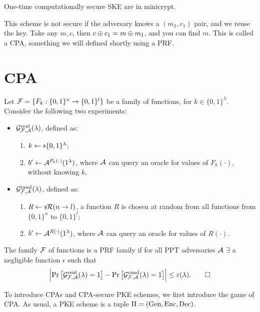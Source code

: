 \begin{corollary}
	One-time computationally secure \ac{SKE} are in minicrypt.
\end{corollary}

This scheme is not secure if the adversary knows a $(m_1, c_1)$ pair, and we reuse the key.
Take any $m, c$, then $c \oplus c_1 = m \oplus m_1$, and you can find $m$.
This is called a \ac{CPA}, something we will defined shortly using a \ac{PRF}.

\section{\acl{CPA}}

\begin{definition}
	Let $\mathcal{F} = \{ F_k : \{0,1\}^{n} \to \{0,1\}^{l} \}$ be a family of functions, for $k \in \{0,1\}^{\lambda}$.
	Consider the following two experiments:
	\begin{itemize}
		\item $\mathcal{G}^{\scriptstyle \text{real}}_{\mathcal{F}, \mathcal{A}}(\lambda)$, defined as:
			\begin{enumerate}
				\item $k \leftarrow {\scriptstyle \$} {\{0,1\}^{\lambda}}$;
				\item $b' \leftarrow \mathcal{A}^{F_k(\cdot)}(1^{\lambda})$, where $\mathcal{A}$ can query an oracle for values of $F_k(\cdot)$, without knowing $k$.
			\end{enumerate}
		\item $\mathcal{G}^{\scriptstyle \text{rand}}_{\mathcal{F}, \mathcal{A}}(\lambda)$, defined as:
			\begin{enumerate}
				\item $R \leftarrow {\scriptstyle \$} {\mathcal{R}(n \to l)}$, \ie a function $R$ is chosen at random from all functions from $\{0,1\}^{n}$ to $\{0,1\}^{l}$;
				\item $b' \leftarrow \mathcal{A}^{R(\cdot)}(1^{\lambda})$, where $\mathcal{A}$ can query an oracle for values of $R(\cdot)$.
			\end{enumerate}
	\end{itemize}
	The family $\mathcal{F}$ of functions is a \ac{PRF} family if for all \ac{PPT} adversaries $\mathcal{A}$ $\exists$ a negligible function $\epsilon$ such that
	\begin{equation*}
		\left|{
			\mathop{\mathrm{Pr}}\limits_{} \left[ {\mathcal{G}^{\scriptstyle \text{real}}_{\mathcal{F}, \mathcal{A}}(\lambda) = 1} \right]
			-
			\mathop{\mathrm{Pr}}\limits_{} \left[ {\mathcal{G}^{\scriptstyle \text{rand}}_{\mathcal{F}, \mathcal{A}}(\lambda) = 1} \right]
		}\right|
		\le \varepsilon(\lambda). \qedhere
	\end{equation*}
\end{definition}

To introduce \acp{CPA} and \ac{CPA}-secure \ac{PKE} schemes, we first introduce the game of \ac{CPA}.
As usual, a \ac{PKE} scheme is a tuple $\Pi = \left( \mathrm{Gen} , \allowbreak \mathrm{Enc} , \allowbreak \mathrm{Dec} \right)$.

